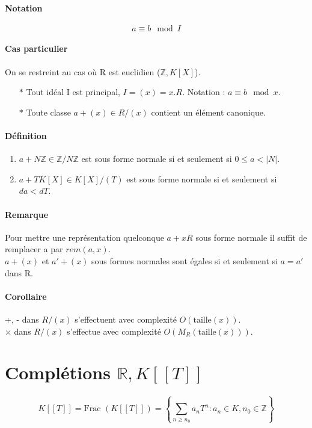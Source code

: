\documentclass[12pt,a4paper]{report}
\begin{document}
\paragraph{Notation\\}
$$a \equiv b \mod I$$
\paragraph{Cas particulier\\}
On se restreint au cas où R est euclidien ($\mathbb{Z},K[X]$).
\begin{itemize}
\item[$*$] Tout idéal I est principal, $I=(x)=x.R$. Notation : $a\equiv b \mod x$.
\item[$*$] Toute classe $a + (x) \in R/(x)$ contient un élément canonique.
\end{itemize}
\paragraph{Définition\\}
\begin{enumerate}
\item $a+N\mathbb{Z} \in \mathbb{Z}/N \mathbb{Z}$ est sous forme normale si et seulement si $0  \leqslant a < |N|$.
\item $ a + TK[X] \in K[X]/(T)$ est sous forme normale si et seulement si $da < d T$.
\end{enumerate}
\paragraph{Remarque\\}
Pour mettre une représentation quelconque $a+xR$ sous forme normale il suffit de remplacer a par $rem (a,x)$.\\
$a+(x) $ et $a'+(x)$ sous formes normales sont égales si et seulement si $a=a'$ dans R.
\paragraph{Corollaire\\}
+, - dans $R/(x)$ s'effectuent avec complexité $ O(\mbox{taille}(x))$.\\
$\times$  dans $R/(x)$ s'effectue avec complexité $ O(M_R(\mbox{taille}(x)))$.
\section{Complétions $\mathbb{R}, K[[T]]$}
$$K[[T]]=\mbox{Frac }(K[[T]])=\left\{\sum_{n\geqslant n_0}a_n T^n : a_n \in K, n_0 \in \mathbb{Z}\right\}$$
\end{document}
